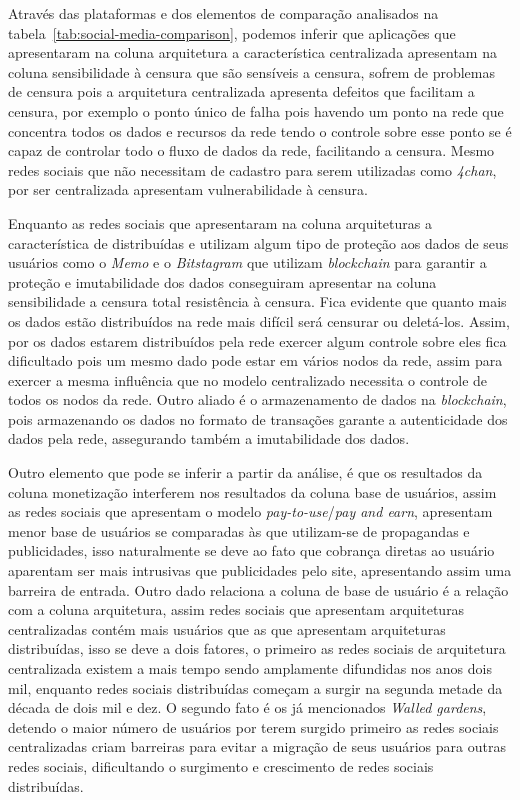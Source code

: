 Através das plataformas e dos elementos de comparação analisados na tabela~\ref{tab:social-media-comparison}, podemos inferir que aplicações que apresentaram na coluna arquitetura a característica centralizada  apresentam na coluna sensibilidade à censura que são sensíveis a  censura, sofrem de problemas de censura pois a arquitetura centralizada apresenta defeitos que facilitam a censura, por exemplo o ponto único de falha pois havendo um ponto na rede que concentra todos os dados e recursos da rede tendo o controle sobre esse ponto se é capaz de controlar todo o fluxo de dados da rede, facilitando a censura. Mesmo redes sociais que não necessitam de cadastro para serem utilizadas como \textit{4chan}, por ser centralizada apresentam vulnerabilidade à censura.

Enquanto as redes sociais que apresentaram na coluna arquiteturas a característica de  distribuídas e utilizam algum tipo de proteção aos dados de seus usuários como o \textit{Memo} e o \textit{Bitstagram} que utilizam \textit{blockchain} para garantir a proteção e imutabilidade dos dados conseguiram apresentar na coluna sensibilidade a censura total resistência à censura. Fica evidente que quanto mais os dados estão distribuídos na rede mais difícil será  censurar ou deletá-los. Assim, por os dados estarem distribuídos pela rede exercer algum controle sobre eles fica dificultado pois um mesmo dado pode estar em vários nodos da rede, assim para exercer a mesma influência que no modelo centralizado necessita o controle de todos os nodos da rede. Outro aliado é o armazenamento de dados na \textit{blockchain}, pois armazenando os dados no formato de transações garante a autenticidade dos dados pela rede, assegurando também a imutabilidade dos dados.

Outro elemento que pode se inferir a partir da análise, é que os resultados  da coluna monetização interferem nos resultados da coluna base de usuários, assim as redes sociais que apresentam o modelo \textit{pay-to-use}/\textit{pay and earn}, apresentam menor base de usuários se comparadas às que utilizam-se de propagandas e publicidades, isso naturalmente se deve ao fato que cobrança diretas ao usuário aparentam ser mais intrusivas que publicidades pelo site, apresentando assim uma barreira de entrada. Outro dado relaciona a coluna de base de usuário é a relação com a coluna arquitetura, assim redes sociais que apresentam arquiteturas centralizadas contém mais usuários que as que apresentam arquiteturas distribuídas, isso se deve a dois fatores, o primeiro as redes sociais de arquitetura centralizada existem a mais tempo sendo amplamente difundidas nos anos dois mil, enquanto redes sociais distribuídas começam a surgir na segunda metade da década de dois mil e dez. O segundo fato é os já mencionados \textit{Walled gardens}, detendo o maior número de usuários por terem surgido primeiro as redes sociais centralizadas criam barreiras para evitar a migração de seus usuários para outras redes sociais, dificultando o surgimento e crescimento de redes sociais distribuídas.

